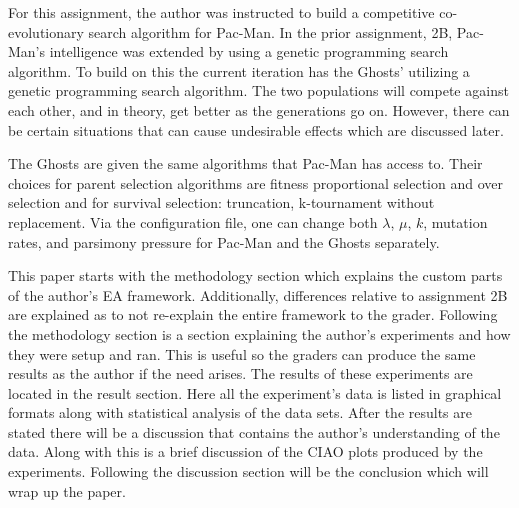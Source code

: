 For this assignment, the author was instructed to build a competitive co-evol\-utionary search algorithm for Pac-Man.
In the prior assignment, 2B, Pac-Man's intelligence was extended by using a genetic programming search algorithm.
To build on this the current iteration has the Ghosts' utilizing a genetic programming search algorithm. 
The two populations will compete against each other, and in theory, get better as the generations go on.
However, there can be certain situations that can cause undesirable effects which are discussed later.

The Ghosts are given the same algorithms that Pac-Man has access to.
Their choices for parent selection algorithms are fitness proportional selection and over selection and for survival selection: truncation, k-tournament without replacement.
Via the configuration file, one can change both $\lambda$, $\mu$, $k$, mutation rates, and parsimony pressure for Pac-Man and the Ghosts separately.

This paper starts with the methodology section which explains the custom parts of the author's EA framework.
Additionally, differences relative to assignment 2B are explained as to not re-explain the entire framework to the grader.
Following the methodology section is a section explaining the author's experiments and how they were setup and ran.
This is useful so the graders can produce the same results as the author if the need arises.
The results of these experiments are located in the result section.
Here all the experiment's data is listed in graphical formats along with statistical analysis of the data sets.
After the results are stated there will be a discussion that contains the author's understanding of the data.
Along with this is a brief discussion of the CIAO plots produced by the experiments.
Following the discussion section will be the conclusion which will wrap up the paper.
